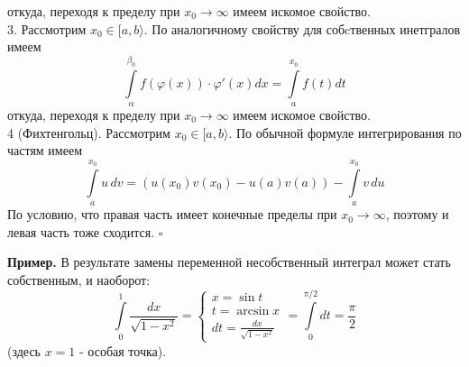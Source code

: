 откуда, переходя к пределу при $x_0\to\infty$ имеем искомое свойство.\\
3. Рассмотрим $x_0\in [a,b\rangle$. По аналогичному свойству для
собcтвенных инетгралов имеем
$$\int\limits_{\alpha}^{\beta_0}f(\varphi(x))\cdot \varphi'(x)dx=
    \int\limits_{a}^{x_0} f(t)dt$$ 
откуда, переходя к пределу при $x_0\to\infty$ имеем искомое свойство.\\
4 (Фихтенгольц). Рассмотрим $x_0\in [a,b\rangle$. По обычной формуле 
интегрирования по частям имеем
$$\int\limits_{a}^{x_0} u\,dv = (u(x_0)v(x_0)-u(a)v(a))-\int\limits_{a}^{x_0}
v\,du$$ 
По условию, что правая часть имеет конечные пределы при $x_0\to \infty$, 
поэтому и левая часть тоже сходится. $\square$ 

\textbf{Пример.} В результате замены переменной несобственный интеграл может 
стать собственным, и наоборот:
$$\int\limits_{0}^{1}\frac{dx}{\sqrt{1-x^2} }=
\begin{cases}
    x=\sin t\\t=\arcsin x\\dt=\frac{dx}{\sqrt{1-x^2}}
\end{cases}=\int\limits_{0}^{\pi/2}dt=\frac{\pi}{2}$$
(здесь $x=1$ - особая точка). 










